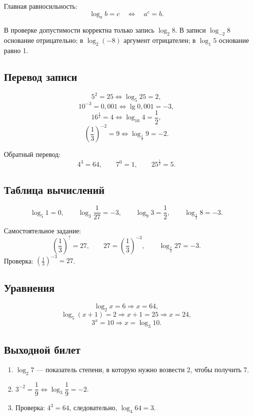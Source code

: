 Главная равносильность:
\[
  \log_a b=c\quad\Longleftrightarrow\quad a^c=b.
\]

В проверке допустимости корректна только запись \(\log_2 8\).
В записи \(\log_{-2}8\) основание отрицательно; в \(\log_2(-8)\)
аргумент отрицателен; в \(\log_1 5\) основание равно 1.

\subsection{Перевод записи}

\[
  5^2=25 \Longleftrightarrow \log_5 25=2,
\]
\[
  10^{-3}=0{,}001 \Longleftrightarrow \lg0{,}001=-3,
\]
\[
  16^{\frac12}=4 \Longleftrightarrow \log_{16}4=\frac12,
\]
\[
  \left(\frac13\right)^{-2}=9
  \Longleftrightarrow
  \log_{\frac13}9=-2.
\]

Обратный перевод:
\[
  4^3=64,
  \qquad
  7^0=1,
  \qquad
  25^{\frac12}=5.
\]

\subsection{Таблица вычислений}

\[
  \log_5 1=0,
  \qquad
  \log_3\frac1{27}=-3,
  \qquad
  \log_9 3=\frac12,
  \qquad
  \log_{\frac12}8=-3.
\]

Самостоятельное задание:
\[
  \left(\frac13\right)^{?}=27,
  \qquad
  27=\left(\frac13\right)^{-3},
  \qquad
  \boxed{\log_{\frac13}27=-3}.
\]
Проверка: \(\left(\frac13\right)^{-3}=27\).

\subsection{Уравнения}

\[
  \log_2 x=6 \Rightarrow x=64,
\]
\[
  \log_5(x+1)=2 \Rightarrow x+1=25 \Rightarrow x=24,
\]
\[
  3^x=10 \Rightarrow x=\log_3 10.
\]

\subsection{Выходной билет}

\begin{enumerate}
  \item \(\log_2 7\) --- показатель степени, в которую нужно возвести 2,
    чтобы получить 7.
  \item \(3^{-2}=\dfrac19\Longleftrightarrow
    \log_3\dfrac19=-2\).
  \item Проверка: \(4^3=64\), следовательно, \(\log_4 64=3\).
\end{enumerate}

